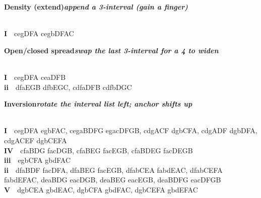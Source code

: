 \documentclass[letterpaper,12pt]{article}
\begin{document}
\begin{multicols}{4}
\noindent\colorbox{hdr4}{\begin{minipage}{\dimexpr\linewidth-2\fboxsep\relax}\raggedright\color{white}\bfseries Density (extend)\quad\normalfont\itshape append a 3-interval (gain a finger)\end{minipage}}\\[0.1mm]
\noindent\hangindent=0.25in {\color{lhcol}\bfseries I}~~{\ttfamily cegDFA cegbDFAC}\\[0.1mm]
\vspace{1.5mm}

\noindent\colorbox{hdr4}{\begin{minipage}{\dimexpr\linewidth-2\fboxsep\relax}\raggedright\color{white}\bfseries Open/closed spread\quad\normalfont\itshape swap the last 3-interval for a 4 to widen\end{minipage}}\\[0.1mm]
\noindent\hangindent=0.25in {\color{lhcol}\bfseries I}~~{\ttfamily cegDFA ceaDFB}\\[0.1mm]
\noindent\hangindent=0.25in {\color{lhcol}\bfseries ii}~~{\ttfamily dfaEGB dfbEGC, cdfaDFB cdfbDGC}\\[0.1mm]
\vspace{1.5mm}



\noindent\colorbox{hdr4}{\begin{minipage}{\dimexpr\linewidth-2\fboxsep\relax}\raggedright\color{white}\bfseries Inversion\quad\normalfont\itshape rotate the interval list left; anchor shifts up\end{minipage}}\\[0.1mm]
\noindent\hangindent=0.25in {\color{lhcol}\bfseries I}~~{\ttfamily cegDFA egbFAC, cegaBDFG egacDFGB, cdgACF dgbCFA, cdgADF dgbDFA, cdgACEF dgbCEFA}\\[0.1mm]
\noindent\hangindent=0.25in {\color{lhcol}\bfseries IV}~~{\ttfamily cfaBDG facDGB, cfaBEG facEGB, cfaBDEG facDEGB}\\[0.1mm]
\noindent\hangindent=0.25in {\color{lhcol}\bfseries iii}~~{\ttfamily egbCFA gbdFAC}\\[0.1mm]
\noindent\hangindent=0.25in {\color{lhcol}\bfseries ii}~~{\ttfamily dfaBDF facDFA, dfaBEG facEGB, dfabCEA fabdEAC, dfabCEFA fabdEFAC, deaBDG eacDGB, deaBEG eacEGB, deaBDFG eacDFGB}\\[0.1mm]
\noindent\hangindent=0.25in {\color{lhcol}\bfseries V}~~{\ttfamily dgbCEA gbdEAC, dgbCFA gbdFAC, dgbCEFA gbdEFAC}\\[0.1mm]
\vspace{1.5mm}


\end{multicols}
\end{document}
